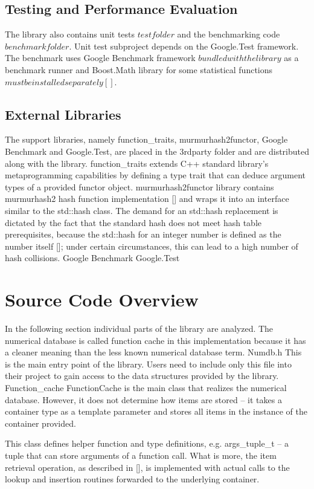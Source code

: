 \subsection{Testing and Performance Evaluation}
The library also contains unit tests \(test folder\) and the benchmarking code \(benchmark folder\). Unit test subproject depends on the Google.Test framework. The benchmark uses Google Benchmark framework \(bundled with the library\) as a benchmark runner and Boost.Math library for some statistical functions \(must be installed separately []\).

\subsection{External Libraries}
The support libraries, namely function\_traits, murmurhash2functor, Google Benchmark and Google.Test, are placed in the 3rdparty folder and are distributed along with the library.
function\_traits extends C++ standard library’s metaprogramming capabilities by defining a type trait that can deduce argument types of a provided functor object.
murmurhash2functor library contains murmurhash2 hash function implementation [] and wraps it into an interface similar to the std::hash class. The demand for an std::hash replacement is dictated by the fact that the standard hash does not meet hash table prerequisites, because the std::hash for an integer number is defined as the number itself []; under certain circumstances, this can lead to a high number of hash collisions.
Google Benchmark
Google.Test



\section{Source Code Overview}
In the following section individual parts of the library are analyzed. The numerical database is called function cache in this implementation because it has a cleaner meaning than the less known numerical database term.
Numdb.h
This is the main entry point of the library. Users need to include only this file into their project to gain access to the data structures provided by the library.
Function\_cache
FunctionCache is the main class that realizes the numerical database. However, it does not determine how items are stored – it takes a container type as a template parameter and stores all items in the instance of the container provided.

This class defines helper function and type definitions, e.g. args\_tuple\_t – a tuple that can store arguments of a function call. What is more, the item retrieval operation, as described in [], is implemented with actual calls to the lookup and insertion routines forwarded to the underlying container.

